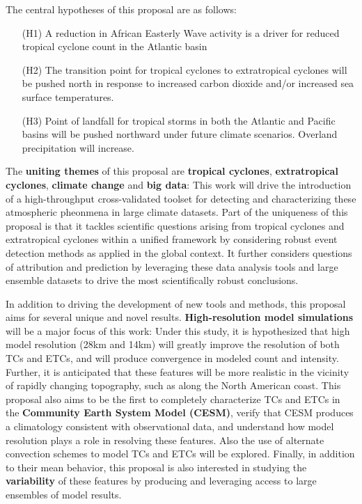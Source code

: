 \documentclass[11pt]{article}
\begin{document}
The central hypotheses of this proposal are as follows:

\vspace{-0.4cm}
\begin{itemize}
\item[(H1)] A reduction in African Easterly Wave activity is a driver for reduced tropical cyclone count in the Atlantic basin

\item[(H2)] The transition point for tropical cyclones to extratropical cyclones will be pushed north in response to increased carbon dioxide and/or increased sea surface temperatures.

\item[(H3)] Point of landfall for tropical storms in both the Atlantic and Pacific basins will be pushed northward under future climate scenarios.  Overland precipitation will increase.
\end{itemize}


The \textbf{uniting themes} of this proposal are \textbf{tropical cyclones}, \textbf{extratropical cyclones}, \textbf{climate change} and \textbf{big data}: This work will drive the introduction of a high-throughput cross-validated toolset for detecting and characterizing these atmospheric pheonmena in large climate datasets.  Part of the uniqueness of this proposal is that it tackles scientific questions arising from tropical cyclones and extratropical cyclones within a unified framework by considering robust event detection methods as applied in the global context.  It further considers questions of attribution and prediction by leveraging these data analysis tools and large ensemble datasets to drive the most scientifically robust conclusions.

In addition to driving the development of new tools and methods, this proposal aims for several unique and novel results.  \textbf{High-resolution model simulations} will be a major focus of this work:  Under this study, it is hypothesized that high model resolution (28km and 14km) will greatly improve the resolution of both TCs and ETCs, and will produce convergence in modeled count and intensity.  Further, it is anticipated that these features will be more realistic in the vicinity of rapidly changing topography, such as along the North American coast.  This proposal also aims to be the first to completely characterize TCs and ETCs in the \textbf{Community Earth System Model (CESM)}, verify that CESM produces a climatology consistent with observational data, and understand how model resolution plays a role in resolving these features.  Also the use of alternate convection schemes to model TCs and ETCs will be explored.  Finally, in addition to their mean behavior, this proposal is also interested in studying the \textbf{variability} of these features by producing and leveraging access to large ensembles of model results.
\end{document}
